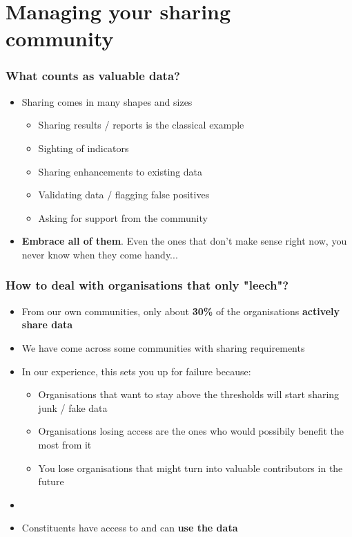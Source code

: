\section{Managing your sharing \\ community}

\begin{frame}
	\frametitle{What counts as valuable data?}
	\begin{itemize}
		\item Sharing comes in many shapes and sizes
		\begin{itemize}
			\item Sharing results / reports is the classical example
			\item Sighting of indicators
			\item Sharing enhancements to existing data
			\item Validating data / flagging false positives
			\item Asking for support from the community
		\end{itemize}
	\item \textbf{Embrace all of them}. Even the ones that don't make sense right now, you never know when they come handy...
	\end{itemize}
\end{frame}

\begin{frame}
	\frametitle{How to deal with organisations that only "leech"?}
	\begin{itemize}
		\item From our own communities, only about \textbf{30\%} of the organisations \textbf{actively share data}
		\item We have come across some communities with sharing requirements
		\item In our experience, this sets you up for failure because:
		\begin{itemize}
			\item Organisations that want to stay above the thresholds will start sharing junk / fake data
			\item Organisations losing access are the ones who would possibily benefit the most from it
			\item You lose organisations that might turn into valuable contributors in the future
		\end{itemize}
		\item []
		\item Constituents have access to and can \textbf{use the data}
	\end{itemize}
\end{frame}

